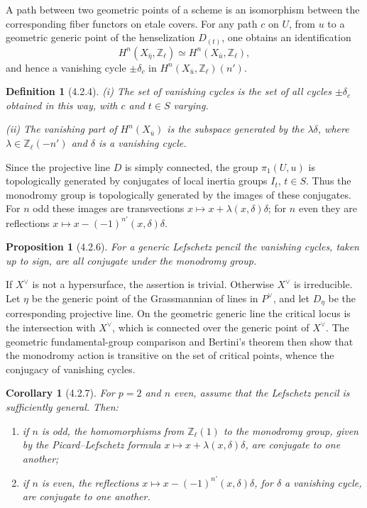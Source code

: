 \documentclass[11pt]{article}
\newtheorem{proposition}{Proposition}
\newtheorem{corollary}{Corollary}
\newtheorem{definition}{Definition}
\theoremstyle{remark}
\begin{document}
A path between two geometric points of a scheme is an isomorphism between the corresponding fiber functors on etale covers. For any path $c$ on $U$, from $u$ to a geometric generic point of the henselization $D_{(t)}$, one obtains an identification
\[
H^n(X_{\bar\eta},\mathbb Z_\ell)\simeq H^n(X_{\bar u},\mathbb Z_\ell),
\]
and hence a vanishing cycle $\pm\delta_c$ in $H^n(X_{\bar u},\mathbb Z_\ell)(n')$.

\begin{definition}[4.2.4]
(i) The set of vanishing cycles is the set of all cycles $\pm\delta_c$ obtained in this way, with $c$ and $t\in S$ varying.

(ii) The vanishing part of $H^n(X_{\bar u})$ is the subspace generated by the $\lambda\delta$, where $\lambda\in\mathbb Z_\ell(-n')$ and $\delta$ is a vanishing cycle.
\end{definition}

Since the projective line $D$ is simply connected, the group $\pi_1(U,u)$ is topologically generated by conjugates of local inertia groups $I_t$, $t\in S$. Thus the monodromy group is topologically generated by the images of these conjugates. For $n$ odd these images are transvections $x\mapsto x+\lambda(x,\delta)\delta$; for $n$ even they are reflections $x\mapsto x-(-1)^{n'}(x,\delta)\delta$.

\begin{proposition}[4.2.6]
For a generic Lefschetz pencil the vanishing cycles, taken up to sign, are all conjugate under the monodromy group.
\end{proposition}

If $X^\vee$ is not a hypersurface, the assertion is trivial. Otherwise $X^\vee$ is irreducible. Let $\eta$ be the generic point of the Grassmannian of lines in $P^\vee$, and let $D_\eta$ be the corresponding projective line. On the geometric generic line the critical locus is the intersection with $X^\vee$, which is connected over the generic point of $X^\vee$. The geometric fundamental-group comparison and Bertini's theorem then show that the monodromy action is transitive on the set of critical points, whence the conjugacy of vanishing cycles.

\begin{corollary}[4.2.7]
For $p=2$ and $n$ even, assume that the Lefschetz pencil is sufficiently general. Then:
\begin{enumerate}[label=(\roman*)]
\item if $n$ is odd, the homomorphisms from $\mathbb Z_\ell(1)$ to the monodromy group, given by the Picard--Lefschetz formula $x\mapsto x+\lambda(x,\delta)\delta$, are conjugate to one another;
\item if $n$ is even, the reflections $x\mapsto x-(-1)^{n'}(x,\delta)\delta$, for $\delta$ a vanishing cycle, are conjugate to one another.
\end{enumerate}
\end{corollary}
\end{document}
